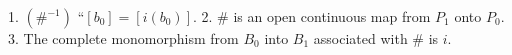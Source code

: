 1. $(\#^{-1})$ “$[b_0] = [i(b_0)]$.
2. $\#$ is an open continuous map from $P_1$ onto $P_0$.
3. The complete monomorphism from $B_0$ into $B_1$ associated with $\#$ is $i$.
